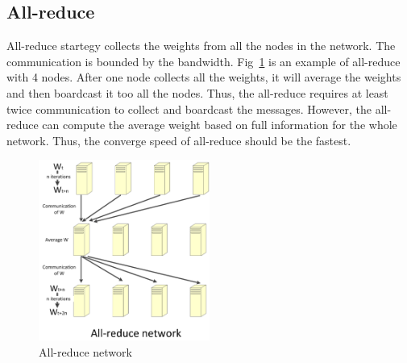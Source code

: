 \documentclass{article}
\begin{document}
\subsection{All-reduce}
All-reduce startegy collects the weights from all the nodes in the network. The communication is bounded by 
the bandwidth. Fig~\ref{fig:allreduce} is an example of all-reduce with 4 nodes. After one node collects all 
the weights, it will average the weights and then boardcast it too all the nodes. Thus, the all-reduce 
requires at least twice communication to collect and boardcast the messages. However, the all-reduce can 
compute the average weight based on full information for the whole network. Thus, the converge speed of 
all-reduce should be the fastest.
\begin{figure}[htb]
  \centering
  \includegraphics[width=0.5\textwidth]{allreduce.jpg}
  \caption{All-reduce network}
  \label{fig:allreduce}
\end{figure}
\end{document}
